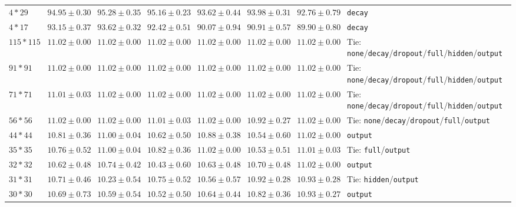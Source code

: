 \documentclass[conference]{IEEEtran}
\begin{document}
\begin{longtable}{@{}lccccccl@{}}
$4*29$ & $94.95 \pm 0.30$ & \bfseries $95.28 \pm 0.35$ & $95.16 \pm 0.23$ & $93.62 \pm 0.44$ & $93.98 \pm 0.31$ & $92.76 \pm 0.79$ & \texttt{decay} \\
$4*17$ & $93.15 \pm 0.37$ & \bfseries $93.62 \pm 0.32$ & $92.42 \pm 0.51$ & $90.07 \pm 0.94$ & $90.91 \pm 0.57$ & $89.90 \pm 0.80$ & \texttt{decay} \\
$115*115$ & \bfseries $11.02 \pm 0.00$ & \bfseries $11.02 \pm 0.00$ & \bfseries $11.02 \pm 0.00$ & \bfseries $11.02 \pm 0.00$ & \bfseries $11.02 \pm 0.00$ & \bfseries $11.02 \pm 0.00$ & Tie: \texttt{none}/\texttt{decay}/\texttt{dropout}/\texttt{full}/\texttt{hidden}/\texttt{output} \\
$91*91$ & \bfseries $11.02 \pm 0.00$ & \bfseries $11.02 \pm 0.00$ & \bfseries $11.02 \pm 0.00$ & \bfseries $11.02 \pm 0.00$ & \bfseries $11.02 \pm 0.00$ & \bfseries $11.02 \pm 0.00$ & Tie: \texttt{none}/\texttt{decay}/\texttt{dropout}/\texttt{full}/\texttt{hidden}/\texttt{output} \\
$71*71$ & \bfseries $11.01 \pm 0.03$ & \bfseries $11.02 \pm 0.00$ & \bfseries $11.02 \pm 0.00$ & \bfseries $11.02 \pm 0.00$ & \bfseries $11.02 \pm 0.00$ & \bfseries $11.02 \pm 0.00$ & Tie: \texttt{none}/\texttt{decay}/\texttt{dropout}/\texttt{full}/\texttt{hidden}/\texttt{output} \\
$56*56$ & \bfseries $11.02 \pm 0.00$ & \bfseries $11.02 \pm 0.00$ & \bfseries $11.01 \pm 0.03$ & \bfseries $11.02 \pm 0.00$ & $10.92 \pm 0.27$ & \bfseries $11.02 \pm 0.00$ & Tie: \texttt{none}/\texttt{decay}/\texttt{dropout}/\texttt{full}/\texttt{output} \\
$44*44$ & $10.81 \pm 0.36$ & $11.00 \pm 0.04$ & $10.62 \pm 0.50$ & $10.88 \pm 0.38$ & $10.54 \pm 0.60$ & \bfseries $11.02 \pm 0.00$ & \texttt{output} \\
$35*35$ & $10.76 \pm 0.52$ & $11.00 \pm 0.04$ & $10.82 \pm 0.36$ & \bfseries $11.02 \pm 0.00$ & $10.53 \pm 0.51$ & \bfseries $11.01 \pm 0.03$ & Tie: \texttt{full}/\texttt{output} \\
$32*32$ & $10.62 \pm 0.48$ & $10.74 \pm 0.42$ & $10.43 \pm 0.60$ & $10.63 \pm 0.48$ & $10.70 \pm 0.48$ & \bfseries $11.02 \pm 0.00$ & \texttt{output} \\
$31*31$ & $10.71 \pm 0.46$ & $10.23 \pm 0.54$ & $10.75 \pm 0.52$ & $10.56 \pm 0.57$ & \bfseries $10.92 \pm 0.28$ & \bfseries $10.93 \pm 0.28$ & Tie: \texttt{hidden}/\texttt{output} \\
$30*30$ & $10.69 \pm 0.73$ & $10.59 \pm 0.54$ & $10.52 \pm 0.50$ & $10.64 \pm 0.44$ & $10.82 \pm 0.36$ & \bfseries $10.93 \pm 0.27$ & \texttt{output} \\

\end{longtable}
\end{document}
